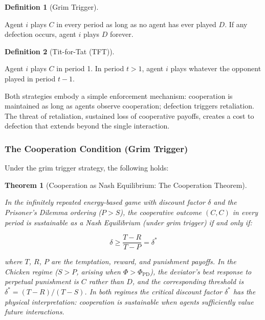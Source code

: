 \documentclass[11pt]{article}
\theoremstyle{plain}
\newtheorem{theorem}{Theorem}
\theoremstyle{definition}
\newtheorem{definition}{Definition}
\theoremstyle{remark}
\let\origsubsubsection\subsubsection
\renewcommand{\subsubsection}{\needspace{4\baselineskip}\origsubsubsection}
\begin{document}
\begin{definition}[Grim Trigger]
\label{def-grim-trigger}

Agent $i$ plays $C$ in every period as long as no agent has ever played $D$. If any defection occurs, agent $i$ plays $D$ forever.
\end{definition}

\begin{definition}[Tit-for-Tat (TFT)]
\label{def-tit-for-tat}

Agent $i$ plays $C$ in period 1. In period $t > 1$, agent $i$ plays whatever the opponent played in period $t - 1$.
\end{definition}

Both strategies embody a simple enforcement mechanism: cooperation is
maintained as long as agents observe cooperation; defection triggers
retaliation. The threat of retaliation, sustained loss of cooperative
payoffs, creates a cost to defection that extends beyond the single
interaction.

\subsubsection{The Cooperation Condition (Grim
Trigger)}\label{the-cooperation-condition-grim-trigger}

Under the grim trigger strategy, the following holds:

\begin{theorem}[Cooperation as Nash Equilibrium: The Cooperation Theorem]
\label{thm-cooperation-theorem}

In the infinitely repeated energy-based game with discount factor $\delta$ and the Prisoner's Dilemma ordering ($P > S$), the cooperative outcome $(C, C)$ in every period is sustainable as a Nash Equilibrium (under grim trigger) if and only if:

$$\delta \geq \frac{T - R}{T - P} = \delta^*$$

where $T$, $R$, $P$ are the temptation, reward, and punishment payoffs. In the Chicken regime ($S > P$, arising when $\Phi > \Phi_{\text{PD}}$), the deviator's best response to perpetual punishment is $C$ rather than $D$, and the corresponding threshold is $\delta^* = (T - R)/(T - S)$. In both regimes the critical discount factor $\delta^*$ has the physical interpretation: cooperation is sustainable when agents sufficiently value future interactions.
\end{theorem}
\end{document}
